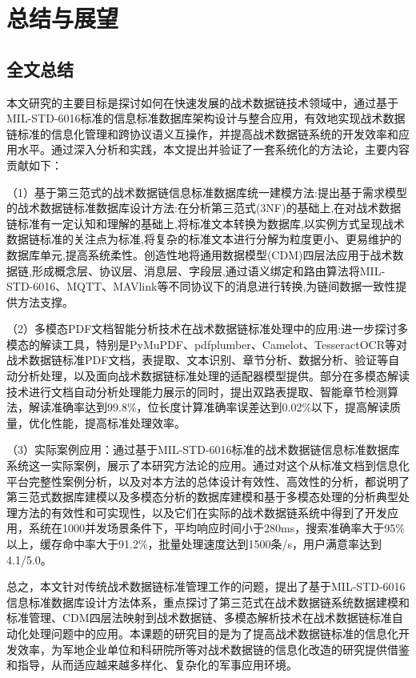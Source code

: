 \chapter{总结与展望}

\section{全文总结}

本文研究的主要目标是探讨如何在快速发展的战术数据链技术领域中，通过基于MIL-STD-6016标准的信息标准数据库架构设计与整合应用，有效地实现战术数据链标准的信息化管理和跨协议语义互操作，并提高战术数据链系统的开发效率和应用水平。通过深入分析和实践，本文提出并验证了一套系统化的方法论，主要内容贡献如下：

（1）基于第三范式的战术数据链信息标准数据库统一建模方法:提出基于需求模型的战术数据链标准数据库设计方法:在分析第三范式(3NF)的基础上,在对战术数据链标准有一定认知和理解的基础上,将标准文本转换为数据库,以实例方式呈现战术数据链标准的关注点为标准,将复杂的标准文本进行分解为粒度更小、更易维护的数据库单元,提高系统柔性。创造性地将通用数据模型(CDM)四层法应用于战术数据链,形成概念层、协议层、消息层、字段层,通过语义绑定和路由算法将MIL-STD-6016、MQTT、MAVlink等不同协议下的消息进行转换,为链间数据一致性提供方法支撑。

（2）多模态PDF文档智能分析技术在战术数据链标准处理中的应用:进一步探讨多模态的解读工具，特别是PyMuPDF、pdfplumber、Camelot、TesseractOCR等对战术数据链标准PDF文档，表提取、文本识别、章节分析、数据分析、验证等自动分析处理，以及面向战术数据链标准处理的适配器模型提供。部分在多模态解读技术进行文档自动分析处理能力展示的同时，提出双路表提取、智能章节检测算法，解读准确率达到99.8\%，位长度计算准确率误差达到0.02\%以下，提高解读质量，优化性能，提高标准处理效率。

（3）实际案例应用：通过基于MIL-STD-6016标准的战术数据链信息标准数据库系统这一实际案例，展示了本研究方法论的应用。通过对这个从标准文档到信息化平台完整性案例分析，以及对本方法的总体设计有效性、高效性的分析，都说明了第三范式数据库建模以及多模态分析的数据库建模和基于多模态处理的分析典型处理方法的有效性和可实现性，以及它们在实际的战术数据链系统中得到了开发应用，系统在1000并发场景条件下，平均响应时间小于280ms，搜索准确率大于95\%以上，缓存命中率大于91.2\%，批量处理速度达到1500条/s，用户满意率达到4.1/5.0。

总之，本文针对传统战术数据链标准管理工作的问题，提出了基于MIL-STD-6016信息标准数据库设计方法体系，重点探讨了第三范式在战术数据链系统数据建模和标准管理、CDM四层法映射到战术数据链、多模态解析技术在战术数据链标准自动化处理问题中的应用。本课题的研究目的是为了提高战术数据链标准的信息化开发效率，为军地企业单位和科研院所等对战术数据链的信息化改造的研究提供借鉴和指导，从而适应越来越多样化、复杂化的军事应用环境。

